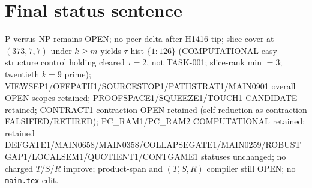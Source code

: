 \documentclass[11pt]{article}
\begin{document}
\section*{Final status sentence}
P versus NP remains OPEN; no peer delta after H1416 tip; slice-cover at $(373,7,7)$ under $k{\ge}m$ yields $\tau$-hist $\{1{:}126\}$ (COMPUTATIONAL easy-structure control holding cleared $\tau{=}2$, not TASK-001; slice-rank min $=3$; twentieth $k{=}9$ prime); VIEWSEP1/OFFPATH1/SOURCESTOP1/PATHSTRAT1/MAIN0901 overall OPEN scopes retained; PROOFSPACE1/SQUEEZE1/TOUCH1 CANDIDATE retained; CONTRACT1 contraction OPEN retained (self-reduction-as-contraction FALSIFIED/RETIRED); PC\_RAM1/PC\_RAM2 COMPUTATIONAL retained; retained DEFGATE1/MAIN0658/MAIN0358/COLLAPSEGATE1/MAIN0259/ROBUSTGAP1/LOCALSEM1/QUOTIENT1/CONTGAME1 statuses unchanged; no charged $T$/$S$/$R$ improve; product-span and $(T,S,R)$ compiler still OPEN; no \texttt{main.tex} edit.
\end{document}
